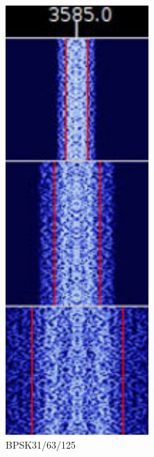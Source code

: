 \begin{frame}
\begin{columns}[c]
\begin{center}
            \includegraphics[width=1\textwidth,height=.7\textheight,keepaspectratio]{e16/BPSK_31_63_125.jpg}
            \tiny \hyperlink{refs}{\cite{wc}}
            \scriptsize BPSK31/63/125
        \end{center}
    \end{columns}

\end{frame}

